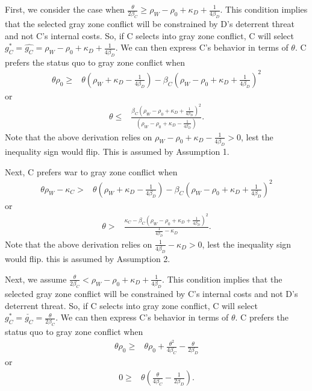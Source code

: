 \documentclass[
]{article}
\begin{document}
First, we consider the case when \(\frac{\theta}{2\beta_{C}}\geq\rho_{W}-\rho_{0}+\kappa_{D}+\frac{1}{4\beta_{D}}\). This condition implies that the selected gray zone conflict will be constrained by D's deterrent threat and not C's internal costs. So, if C selects into gray zone conflict, C will select \(g_{C}^{*}=\hat{g_{C}}=\rho_{W}-\rho_{0}+\kappa_{D}+\frac{1}{4\beta_{D}}\). We can then express C's behavior in terms of \(\theta\). C prefers the status quo to gray zone conflict when
\begin{align*}
  \theta\rho_{0}\geq & \theta\left(\rho_{W}+\kappa_{D}-\frac{1}{4\beta_{D}}\right)-\beta_{C}\left(\rho_{W}-\rho_{0}+\kappa_{D}+\frac{1}{4\beta_{D}}\right)^{2}
  \end{align*}
or
\begin{align*}
  \theta\leq & \frac{\beta_{C}\left(\rho_{W}-\rho_{0}+\kappa_{D}+\frac{1}{4\beta_{D}}\right)^{2}}{\left(\rho_{W}-\rho_{0}+\kappa_{D}-\frac{1}{4\beta_{D}}\right)}.
  \end{align*}
Note that the above derivation relies on \(\rho_{W}-\rho_{0}+\kappa_{D}-\frac{1}{4\beta_{D}}>0\), lest the inequality sign would flip. This is assumed by Assumption 1.

Next, C prefers war to gray zone conflict when
\begin{align*}
  \theta\rho_{W}-\kappa_{C}> & \theta\left(\rho_{W}+\kappa_{D}-\frac{1}{4\beta_{D}}\right)-\beta_{C}\left(\rho_{W}-\rho_{0}+\kappa_{D}+\frac{1}{4\beta_{D}}\right)^{2}
  \end{align*}
or
\begin{align*}
  \theta> & \frac{\kappa_{C}-\beta_{C}\left(\rho_{W}-\rho_{0}+\kappa_{D}+\frac{1}{4\beta_{D}}\right)^{2}}{\frac{1}{4\beta_{D}}-\kappa_{D}}.
  \end{align*}
Note that the above derivation relies on \(\frac{1}{4\beta_{D}}-\kappa_{D}>0\), lest the inequality sign would flip. this is assumed by Assumption 2.

Next, we assume \(\frac{\theta}{2\beta_{C}}<\rho_{W}-\rho_{0}+\kappa_{D}+\frac{1}{4\beta_{D}}\). This condition implies that the selected gray zone conflict will be constrained by C's internal costs and not D's deterrent threat. So, if C selects into gray zone conflict, C will select \(g_{C}^{*}=\check{g_{C}}=\frac{\theta}{2\beta_{C}}\). We can then express C's behavior in terms of \(\theta\). C prefers the status quo to gray zone conflict when
\begin{align*}
  \theta\rho_{0}\geq & \theta\rho_{0}+\frac{\theta^{2}}{4\beta_{C}}-\frac{\theta}{2\beta_{D}}
  \end{align*}
or
\begin{align*}
  0\geq & \theta\left(\frac{\theta}{4\beta_{C}}-\frac{1}{2\beta_{D}}\right).
  \end{align*}
\end{document}
